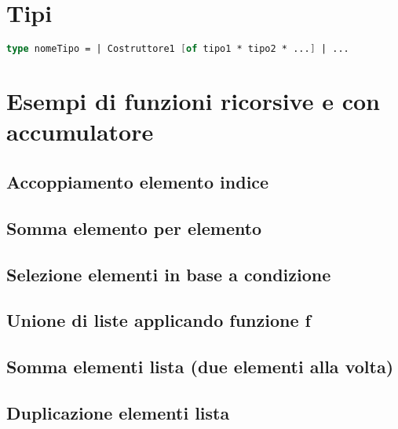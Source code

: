 \documentclass[12pt]{article}
\begin{document}
\section{Tipi}
\begin{lstlisting}[language=FSharp]
    type nomeTipo = | Costruttore1 [of tipo1 * tipo2 * ...] | ...
\end{lstlisting}
\section{Esempi di funzioni ricorsive e con accumulatore}
\subsection*{Accoppiamento elemento indice}
    
\subsection*{Somma elemento per elemento}
    
\subsection*{Selezione elementi in base a condizione}
    
\subsection*{Unione di liste applicando funzione f}
    
\subsection*{Somma elementi lista (due elementi alla volta)}
    
\subsection*{Duplicazione elementi lista}
    
\end{document}
